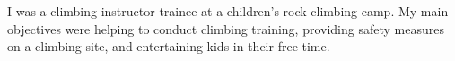 I was a climbing instructor trainee at a children's rock climbing camp. My main objectives were helping to conduct climbing training, providing safety measures on a climbing site, and entertaining kids in their free time.